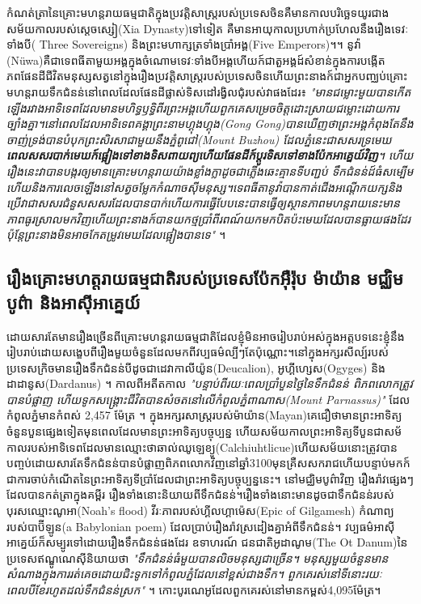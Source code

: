 \documentclass[10pt,twocolumn,letterpaper]{article}
\begin{document}
 កំណត់ត្រានៃគ្រោះមហន្តរាយធម្មជាតិក្នុងប្រវត្តិសាស្ត្ររបស់ប្រទេសចិនគឺមានកាលបរិច្ឆេទយូរជាងសម័យកាលរបស់ស្តេចស្សៀ(Xia Dynasty)ទៅទៀត គឺមានអាយុកាលប្រហាក់ប្រហែលនឹងរឿងទេវៈទាំងបី( Three Sovereigns) និងព្រះមហាក្សត្រទាំងប្រាំអង្គ(Five Emperors)។\cite{7}។ នូវ៉ា​(Nüwa)គឺជាទេពធីតាមួយអង្គក្នុងចំណោមទេវៈទាំងបីអង្គ​ហើយក៍ជាតួអង្គដ៍សំខាន់ក្នុងការបង្កើតភពផែនដី​ជីវិតមនុស្ស​សត្វនៅក្នុងរឿងប្រវត្តិសាស្ត្ររបស់ប្រទេសចិន​ហើយព្រះនាងក៍ជាអ្នកបញ្ឈប់គ្រោះមហន្តរាយទឹកជំនន់នៅពេលដែលផែនដីផ្លាស់ទិសដៅរង្វិលជុំរបស់វាផងដែរ៖ \textit{"មានជម្លោះមួយបានកើតឡើងរវាងអាទិទេពដែលមានមហិទ្ធឫទ្ធិពីរព្រះអង្គ​ហើយពួកគេសម្រេចចិត្តដោះស្រាយជម្លោះដោយការច្បាំងគ្នា។​នៅពេលដែលអាទិទេពគង្គាព្រះនាម​ហ្គុង​ហ្គុង​(Gong Gong)​បានឃើញថាព្រះអង្គកំពុងតែនឹងចាញ់​ទ្រង់បានបំបុកព្រះសិរសាជាមួយនឹងភ្នំពូជៅ​(Mount Buzhou) ដែលភ្នំនេះជាសសរទ្រមេឃ​ \textbf{ពេលសសរបាក់​មេឃក៍ផ្អៀងទៅខាងទិសពាយព្យ​ហើយផែនដីក៍ប្តូរទិសទៅខាងប៉ែកអាគ្នេយ៍វិញ}។ ហើយរឿងនេះវាបានបង្ករឲ្យមានគ្រោះមហន្តរាយយ៉ាងខ្លាំងក្លាដូចជា​ភ្លើងឆេះគ្មានទីបញ្ជប់ ទឹកជំនន់ដ៍ធំសម្បើម​ហើយនិងការលេចឡើងនៅសត្វចម្លែកកំណាចស៊ីមនុស្ស។ទេពធីតានូវ៉ាបានកាត់ជើងអណ្តើកយក្សនិងប្រើវាជាសសរជំនួសសសរដែលបានបាក់​ហើយការធ្វើបែបនេះបានធ្វើឲ្យស្ថានភាពមហន្តរាយនេះមានភាពធូរស្រាលមកវិញ​ហើយព្រះនាងក៍បានយកថ្មប្រាំពីរពណ៍យកមកបិតប៉ះមេឃដែលបានធ្លាយផងដែរ​ប៉ុន្តែព្រះនាងមិនអាចកែតម្រូវមេឃដែលផ្អៀងបានទេ​"} \cite{8}។

\subsection{រឿងគ្រោះមហត្តរាយធម្មជាតិរបស់ប្រទេសប៉ែកអ៊ឺរ៉ុប ម៉ាយ៉ាន មជ្ឈិមបូព៌ា និងអាស៊ីអាគ្នេយ៍}

ដោយសារតែមានរឿងច្រើនពីគ្រោះមហន្តរាយធម្មជាតិដែលខ្ញុំមិនអាចរៀបរាប់អស់ក្នុងអត្តបទនេះ​ខ្ញុំនឹងរៀបរាប់ដោយសង្ខេបពីរឿងមួយចំនួនដែលមកពីវប្បធម៌ល្បីៗតែប៉ុណ្ណោះ។នៅក្នុងអក្សរសីល្ប៍របស់ប្រទេសក្រិចមានរឿងទឹកជំនន់បីដូចជា​ដេវាកាលីយ៉ូន(Deucalion), អូហ្គីហ្សេស(Ogyges) និង ដាដានូស(Dardanus) \cite{9,10}។ កាលពីអតីតកាល \textit{"បន្ទាប់ពីរយៈពេលប្រាំបួនថ្ងៃនៃទឹកជំនន់ ពិភពលោកត្រូវបានបំផ្លាញ ហើយទូកសង្រ្គោះជីវិតបានសំចតនៅលើកំពូលភ្នំពាណាស(Mount Parnassus)"} ដែលកំពូលភ្នំមានកំពស់ 2,457 ម៉ែត្រ \cite{11}។ ក្នុងអក្សរសាស្ត្ររបស់ម៉ាយ៉ាន(Mayan)គេជឿថាមានព្រះអាទិត្យចំនួនបួនផ្សេងទៀតមុនពេលដែលមានព្រះអាទិត្យបច្ចុប្បន្ន ហើយសម័យកាលព្រះអាទិត្យទីបួនជាសម័កាលរបស់អាទិទេពដែលមានឈ្មោះថាឆាល់ឈូឡេខ្យូ(Calchiuhtlicue)ហើយសម័យនោះត្រូវបានបញ្ចប់ដោយសារតែទឹកជំនន់បានបំផ្លាញពិភពលោកវិញនៅឆ្នាំ3100មុនគ្រឺសសករាជ​ហើយបន្ទាប់មកក៍ជាការចាប់កំណើតនៃព្រះអាទិត្យទីប្រាំដែលជាព្រះអាទិត្យបច្ចុប្បន្ននេះ\cite{12}។ នៅមជ្ឈិមបូព៌ាវិញ រឿងរ៉ាវផ្សេងៗដែលបានកត់ត្រាក្នុងគម្ពីរ រឿងទាំងនោះនិយាយពីទឹកជំនន់។រឿងទាំងនោះមានដូចជា​ទឹកជំនន់របស់បុរសឈ្មោះណូអា(Noah's flood) វីរៈភាពរបស់​ហ្គីលហ្គាម៉េស​(Epic of Gilgamesh) កំណាព្យរបស់បាប៊ីឡូន(a Babylonian poem) ដែលប្រាប់រឿងរ៉ាវស្រដៀងគ្នាអំពីទឹកជំនន់\cite{13}។ វប្បធម៌អាស៊ីអាគ្នេយ៍ក៏សម្បូរទៅដោយរឿងទឹកជំនន់ផងដែរ ឧទាហរណ៍ ជនជាតិអូដាណូម​(The Ot Danum)នៃប្រទេសឥណ្ឌូណេស៊ីនិយាយថា \textit{"ទឹកជំនន់ធំមួយបានលិចមនុស្សជាច្រើន។ មនុស្សមួយចំនួនមានសំណាងក្នុងការរត់គេចដោយជិះទូកទៅកំពូលភ្នំដែលនៅខ្ពស់ជាងទឹក។ ពួកគេរស់នៅទីនោះរយៈពេលបីខែរហូតដល់ទឹកជំនន់ស្រក"} \cite{3}។ កោះបូរណេអូដែលពួកគេរស់នៅមានកម្ពស់​4,095ម៉ែត្រ។
\end{document}
